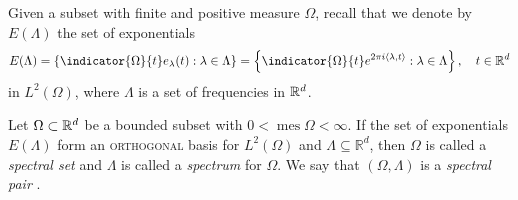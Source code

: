 \documentclass[../thesis.tex]{subfiles}
\begin{document}






Given a subset with finite and positive measure $\Omega$, recall that we denote by $E(\Lambda)$ the set of exponentials
\begin{align}\label{eq:exp_set_all_d}
    E(\Lambda) = \braqMed{\indicator{\Omega}{t} e_\lambda(t) : \lambda \in \Lambda} = \braqMed{\indicator{\Omega}{t} e^{2 \pi i \inpl{t}} : \lambda \in \Lambda}, \quad t\in \R^d
\end{align}
in $L^2(\Omega)$, where $\Lambda$ is a set of frequencies in $\mathbb{R}^d$.
\begin{definition} \label{def:spectral_set}
    Let $\Omega \subset \mathbb{R}^d$ be a bounded subset with $0< \operatorname{mes} \Omega < \infty$. If the set of exponentials $E(\Lambda)$ form an \textsc{orthogonal} basis for $L^2 (\Omega)$ and $\Lambda \subseteq \mathbb{R}^d$, then $\Omega$ is called a \emph{spectral set} and $\Lambda$ is called a \emph{spectrum} for $\Omega$. We say that $(\Omega, \Lambda)$ is a \emph{spectral pair} \cite{liuUniformityNonUniformGabor2003}.
\end{definition} 
\end{document}
